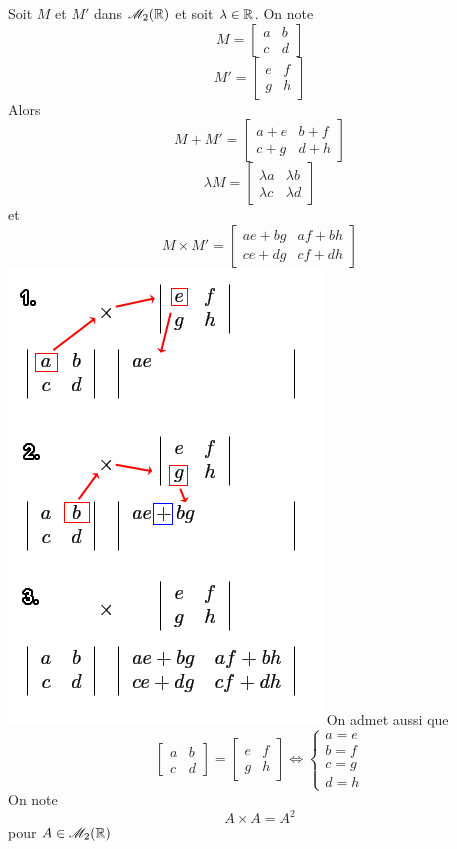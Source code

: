 Soit $M$ et $M'$ dans $\mathscr{M}_2(\mathbb{R})$ et soit $\lambda \in \mathbb{R}$. On note 
$$
M = 
\begin{bmatrix}
   a & b \\
   c & d 
\end{bmatrix}
$$
$$
M' = 
\begin{bmatrix}
   e & f \\
   g & h 
\end{bmatrix}
$$
Alors 
$$M + M' = \begin{bmatrix} a+e & b+ f \\ c+g & d+h\end{bmatrix}$$
$$\lambda M = \begin{bmatrix} \lambda a & \lambda b \\ \lambda c & \lambda d\end{bmatrix}$$
et
$$M\times M' = \begin{bmatrix} ae+bg & af+bh \\ ce+ dg & cf+dh\end{bmatrix}$$
\includegraphics[scale=0.5]{multi_mat.png}\newline
On admet aussi que 
$$\begin{bmatrix} a & b \\ c & d \end{bmatrix} = \begin{bmatrix}e & f \\g & h \end{bmatrix} \Leftrightarrow \left\{\begin{array}{l} a=e\\ b = f \\ c = g \\ d = h \end{array}\right.$$
On note
$$A\times A = A^2$$
pour $A \in \mathscr{M}_2(\mathbb{R})$

